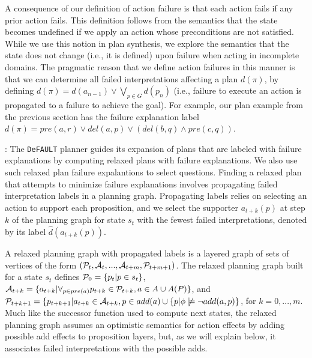 \documentclass{article}
\def\und#1{\noindent{\bf #1}:}
\def\citep#1{\cite{#1}}
\def\default{{\tt DeFAULT}}
\begin{document}
A consequence of our definition of action failure is that each action fails if
any prior action fails.  This definition follows from the semantics that the
state becomes undefined if we apply an action whose preconditions are not
satisfied.  While we use this notion in plan synthesis, we explore the semantics
that the state does not change (i.e., it is defined) upon failure when acting in
incomplete domains.  The pragmatic reason that we define action failures in this
manner is that we can determine all failed interpretations affecting a plan $d(\pi)$,
by defining $d(\pi) = d({a}_{n-1}) \vee \bigvee_{p \in G} d(p_n)$ (i.e.,
failure to execute an action is propagated to a
failure to achieve the goal). For example, our plan example from the previous
section has the failure explanation label $d(\pi) = 
pre(a, r) \vee  del(a, p) \vee (del(b, q) \wedge pre(c, q))$.

\und{Incomplete Domain Relaxed Plans} The \default{} planner
\citep{bryce-icaps11} guides its expansion of plans that are labeled with
failure explanations by computing relaxed plans with failure explanations.  We
also use such relaxed plan failure expalantions to select questions.  Finding a
relaxed plan that attempts to minimize failure explanations involves propagating
failed interpretation labels in a planning graph.  Propagating labels relies on
selecting an action to support each proposition, and we select the supporter
$a_{t+k}(p)$ at step $k$ of the planning graph for state $s_t$ with the
fewest failed interpretations, denoted by its label $\hat{d}(a_{t+k}(p))$. 

A relaxed planning graph with propagated labels is a layered graph of sets of
vertices of the form $({\cal P}_t, {\cal A}_t, ..., {\cal A}_{t+m},
{\cal P}_{t+m+1})$. The relaxed planning graph built for a state
${s}_t$ defines ${\cal P}_0 = \{{p}_t | p \in {s}_t\}$,
${\cal A}_{t+k} = \{ {a}_{t+k} | \forall_{p \in {pre}({a})}
{p}_{t+k} \in {\cal P}_{t+k}, {a} \in {A} \cup A(P)\}$, and
${\cal P}_{t+k+1} = \{p_{t+k+1} | {a}_{t+k} \in {\cal A}_{t+k}, p
\in {add}({a}) \cup \{p | \phi\not\models\neg add({a}, p)\}$, for $k
= 0, ..., m$.  Much like the successor function used to compute next states, the
relaxed planning graph assumes an optimistic semantics for action effects by
adding possible add effects to proposition layers, but, as we will explain
below, it associates failed interpretations with the possible adds.
\end{document}
